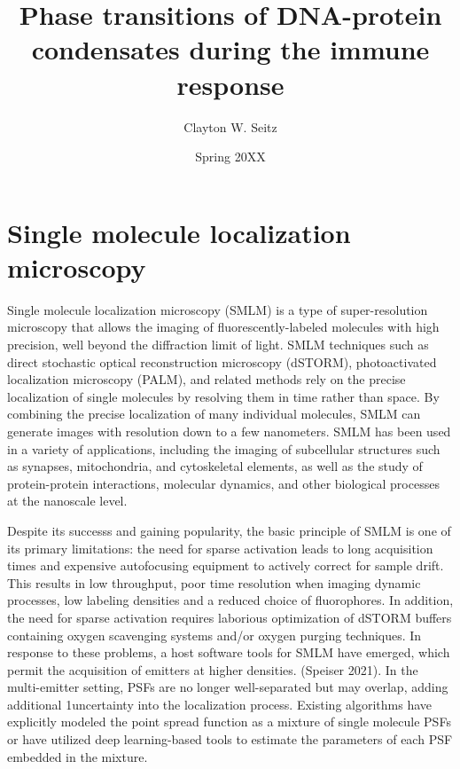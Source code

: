 \documentclass{ucetd}
\title{Phase transitions of DNA-protein condensates during the immune response}
\author{Clayton W. Seitz}
\date{Spring 20XX}
\begin{document}
\maketitle

\makecopyright


\tableofcontents


\abstract



\clearpage

\mainmatter


\chapter{Single molecule localization microscopy}


Single molecule localization microscopy (SMLM) is a type of super-resolution microscopy that allows the imaging of fluorescently-labeled molecules with high precision, well beyond the diffraction limit of light. SMLM techniques such as direct stochastic optical reconstruction microscopy (dSTORM), photoactivated localization microscopy (PALM), and related methods rely on the precise localization of single molecules by resolving them in time rather than space. By combining the precise localization of many individual molecules, SMLM can generate images with resolution down to a few nanometers. SMLM has been used in a variety of applications, including the imaging of subcellular structures such as synapses, mitochondria, and cytoskeletal elements, as well as the study of protein-protein interactions, molecular dynamics, and other biological processes at the nanoscale level.

Despite its successs and gaining popularity, the basic principle of SMLM is one of its primary limitations: the need for sparse activation leads to long acquisition times and expensive autofocusing equipment to actively correct for sample drift. This results in low throughput, poor time resolution when imaging dynamic processes, low labeling densities and a reduced choice of fluorophores. In addition, the need for sparse activation requires laborious optimization of dSTORM buffers containing oxygen scavenging systems and/or oxygen purging techniques. In response to these problems, a host software tools for SMLM have emerged, which permit the acquisition of emitters at higher densities. (Speiser 2021). In the multi-emitter setting, PSFs are no longer well-separated but may overlap, adding additional 1uncertainty into the localization process. Existing algorithms have explicitly modeled the point spread function as a mixture of single molecule PSFs or have utilized deep learning-based tools to estimate the parameters of each PSF embedded in the mixture.  
\end{document}
